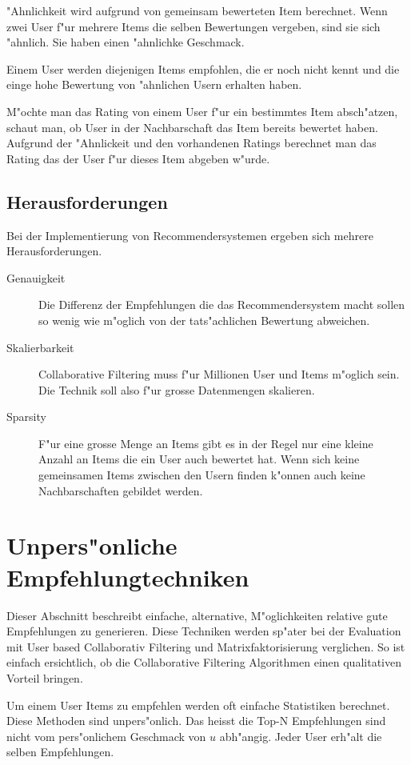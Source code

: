 \documentclass[a4paper, 12pt]{article}
\begin{document}
"Ahnlichkeit wird aufgrund von gemeinsam bewerteten Item berechnet. Wenn zwei User f"ur mehrere Items die selben Bewertungen vergeben, sind sie sich "ahnlich. Sie haben einen "ahnlichke Geschmack.

Einem User werden diejenigen Items empfohlen, die er noch nicht kennt und die einge hohe Bewertung von "ahnlichen Usern erhalten haben.

 M"ochte man das Rating von einem User f"ur ein bestimmtes Item ab\-sch"atz\-en, schaut man, ob User in der Nachbarschaft das Item bereits bewertet haben. Aufgrund der "Ahnlickeit und den vorhandenen Ratings berechnet man das Rating das der User f"ur dieses Item abgeben w"urde.

\subsection{Herausforderungen}
\label{sec:challenges}

Bei der Implementierung von Recommendersystemen ergeben sich mehrere Herausforderungen.

\begin{description}
\item[Genauigkeit] Die Differenz der Empfehlungen die das Recommendersystem macht sollen so wenig wie m"oglich von der tats"achlichen Bewertung abweichen.
\item[Skalierbarkeit] 
Collaborative Filtering muss f"ur Millionen User und Items m"oglich sein. Die Technik soll also f"ur grosse Datenmengen skalieren.
\item[Sparsity] F"ur eine grosse Menge an Items gibt es in der Regel nur eine kleine Anzahl an Items die ein User auch bewertet hat. Wenn sich keine gemeinsamen Items zwischen den Usern finden k"onnen auch keine Nachbarschaften gebildet werden.
\end{description}

\section{Unpers"onliche Empfehlungtechniken}
\label{sec:simple}

Dieser Abschnitt beschreibt einfache, alternative, M"oglichkeiten relative gute Empfehlungen zu generieren. Diese Techniken werden sp"ater bei der Evaluation mit User based Collaborativ Filtering und Matrixfaktorisierung verglichen. So ist einfach ersichtlich, ob die Collaborative Filtering Algorithmen einen qualitativen Vorteil bringen.

Um einem User Items zu empfehlen werden oft einfache Statistiken berechnet. Diese Methoden sind unpers"onlich. Das heisst die Top-N Empfehlungen sind nicht vom pers"onlichem Geschmack von $u$ abh"angig. Jeder User erh"alt die selben Empfehlungen. 
\end{document}
